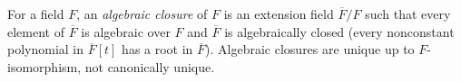 
For a field $F$, an \emph{algebraic closure} of $F$ is an extension field $\overline F/F$ such that every element of $\overline F$ is algebraic over $F$ and $\overline F$ is algebraically closed (every nonconstant polynomial in $\overline F[t]$ has a root in $\overline F$). Algebraic closures are unique up to $F$-isomorphism, not canonically unique.

